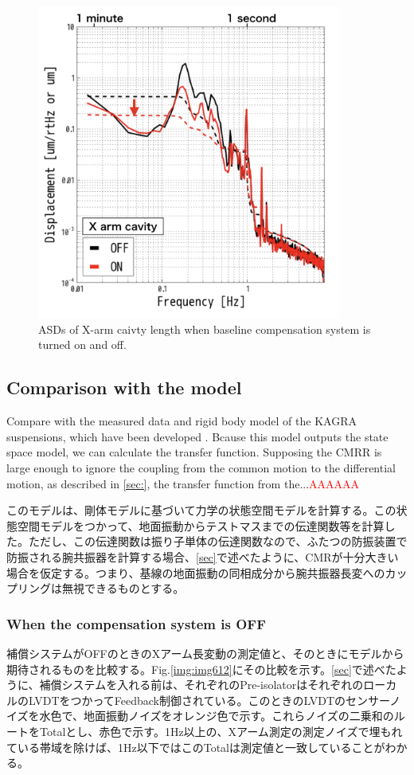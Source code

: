 \begin{figure}[h]
  \centering
  \includegraphics[width=10cm]{./img_chap6/img611.png}
  \caption{ASDs of X-arm caivty length when baseline compensation system is turned on and off. }\label{img:img611}
\end{figure}

\subsection{Comparison with the model}
Compare with the measured data and rigid body model of the KAGRA suspensions, which have been developed \cite{sekiguchi2016astudy}. Bcause this model outputs the state space model, we can calculate the transfer function. Supposing the CMRR is large enough to ignore the coupling from the common motion to the differential motion, as described in \cref{sec:}, the transfer function from the...\textcolor{red}{AAAAAA}


このモデルは、剛体モデルに基づいて力学の状態空間モデルを計算する\cite{sekiguchi2016astudy}。この状態空間モデルをつかって、地面振動からテストマスまでの伝達関数等を計算した。ただし、この伝達関数は振り子単体の伝達関数なので、ふたつの防振装置で防振される腕共振器を計算する場合、\cref{sec}で述べたように、CMRが十分大きい場合を仮定する。つまり、基線の地面振動の同相成分から腕共振器長変へのカップリングは無視できるものとする。

\subsubsection{When the compensation system is OFF}
補償システムがOFFのときのXアーム長変動の測定値と、そのときにモデルから期待されるものを比較する。Fig.\ref{img:img612}にその比較を示す。\cref{sec}で述べたように、補償システムを入れる前は、それぞれのPre-isolatorはそれぞれのローカルのLVDTをつかってFeedback制御されている。このときのLVDTのセンサーノイズを水色で、地面振動ノイズをオレンジ色で示す。これらノイズの二乗和のルートをTotalとし、赤色で示す。1Hz以上の、Xアーム測定の測定ノイズで埋もれている帯域を除けば、1Hz以下ではこのTotalは測定値と一致していることがわかる。

